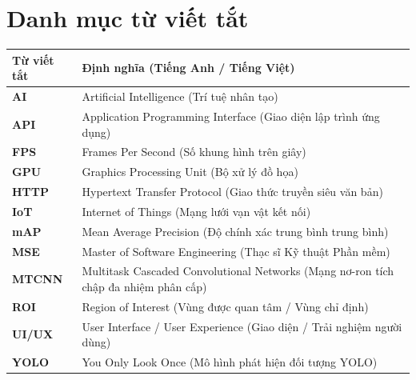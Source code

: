 \documentclass[12pt,a4paper]{article}
\begin{document}
\newpage

\tableofcontents
\newpage

\section*{Danh mục từ viết tắt}

\begin{longtable}{lp{11.5cm}}
\toprule
\textbf{Từ viết tắt} & \textbf{Định nghĩa (Tiếng Anh / Tiếng Việt)} \\
\midrule
\endhead
\textbf{AI} & Artificial Intelligence (Trí tuệ nhân tạo) \\
\textbf{API} & Application Programming Interface (Giao diện lập trình ứng dụng) \\
\textbf{FPS} & Frames Per Second (Số khung hình trên giây) \\
\textbf{GPU} & Graphics Processing Unit (Bộ xử lý đồ họa) \\
\textbf{HTTP} & Hypertext Transfer Protocol (Giao thức truyền siêu văn bản) \\
\textbf{IoT} & Internet of Things (Mạng lưới vạn vật kết nối) \\
\textbf{mAP} & Mean Average Precision (Độ chính xác trung bình trung bình) \\
\textbf{MSE} & Master of Software Engineering (Thạc sĩ Kỹ thuật Phần mềm) \\
\textbf{MTCNN} & Multitask Cascaded Convolutional Networks (Mạng nơ-ron tích chập đa nhiệm phân cấp) \\
\textbf{ROI} & Region of Interest (Vùng được quan tâm / Vùng chỉ định) \\
\textbf{UI/UX} & User Interface / User Experience (Giao diện / Trải nghiệm người dùng) \\
\textbf{YOLO} & You Only Look Once (Mô hình phát hiện đối tượng YOLO) \\
\bottomrule
\end{longtable}

\newpage

\end{document}
